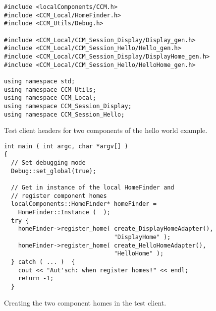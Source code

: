 \begin{Example}
\begin{minifbox}
\begin{small}
\begin{verbatim}
#include <localComponents/CCM.h>
#include <CCM_Local/HomeFinder.h>
#include <CCM_Utils/Debug.h>

#include <CCM_Local/CCM_Session_Display/Display_gen.h>
#include <CCM_Local/CCM_Session_Hello/Hello_gen.h>
#include <CCM_Local/CCM_Session_Display/DisplayHome_gen.h>
#include <CCM_Local/CCM_Session_Hello/HelloHome_gen.h>

using namespace std;
using namespace CCM_Utils;
using namespace CCM_Local;
using namespace CCM_Session_Display;
using namespace CCM_Session_Hello;
\end{verbatim}
\end{small}
\end{minifbox}
\caption{Test client headers for two components of the hello world example.}
\label{example:two-components-includes}
\end{Example}

\begin{Example}
\begin{minifbox}
\begin{small}
\begin{verbatim}
int main ( int argc, char *argv[] )
{
  // Set debugging mode
  Debug::set_global(true);

  // Get in instance of the local HomeFinder and
  // register component homes
  localComponents::HomeFinder* homeFinder =
    HomeFinder::Instance (  );
  try {
    homeFinder->register_home( create_DisplayHomeAdapter(),
                               "DisplayHome" );
    homeFinder->register_home( create_HelloHomeAdapter(),
                               "HelloHome" );
  } catch ( ... )  {
    cout << "Aut'sch: when register homes!" << endl;
    return -1;
  }
\end{verbatim}
\end{small}
\end{minifbox}
\caption{Creating the two component homes in the test client.}
\label{example:two-components-homes}
\end{Example}

